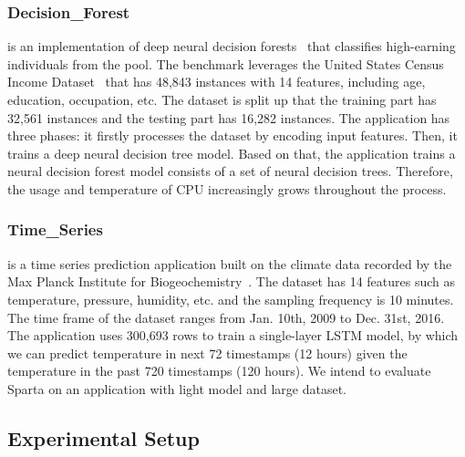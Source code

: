 \subsubsection{Decision\_Forest} is an implementation of deep neural decision forests~\cite{ref:decision_forest} that classifies high-earning individuals from the pool. The benchmark leverages the United States Census Income Dataset~\cite{ref:uci} that has 48,843 instances with 14 features, including age, education, occupation, etc. The dataset is split up that the training part has 32,561 instances and the testing part has 16,282 instances. The application has three phases: it firstly processes the dataset by encoding input features. Then, it trains a deep neural decision tree model. Based on that, the application trains a neural decision forest model consists of a set of neural decision trees. Therefore, the usage and temperature of CPU increasingly grows throughout the process.


\subsubsection{Time\_Series} is a time series prediction application built on the climate data recorded by the Max Planck Institute for Biogeochemistry~\cite{ref:jena}. The dataset has 14 features such as temperature, pressure, humidity, etc. and the sampling frequency is 10 minutes. The time frame of the dataset ranges from Jan. 10th, 2009 to Dec. 31st, 2016. The application uses 300,693 rows to train a single-layer LSTM model, by which we can predict temperature in next 72 timestamps (12 hours) given the temperature in the past 720 timestamps (120 hours). We intend to evaluate Sparta on an application with light model and large dataset.



\subsection{Experimental Setup}


 
